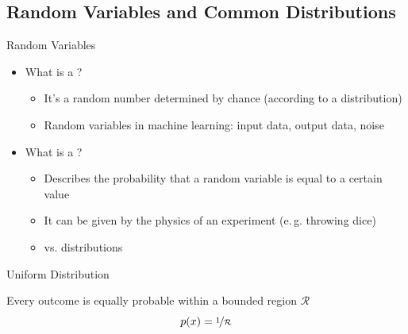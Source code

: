 \subsection{Random Variables and Common Distributions}

\begin{frame}{Random Variables}{}
	\begin{itemize}
		\item What is a ? \pause
		\begin{itemize}
			\item It's a random number determined by chance (according to a distribution)
			\item Random variables in machine learning: input data, output data, noise
		\end{itemize}
		\item What is a ? \pause
		\begin{itemize}
			\item Describes the probability that a random variable is equal to a certain value
			\item It can be given by the physics of an experiment (e.\,g. throwing dice)
			\item {} vs.  distributions
		\end{itemize}
	\end{itemize}
\end{frame}


\begin{frame}{Uniform Distribution}{}
	
	
	\begin{center}
		Every outcome is equally probable within a bounded region $\mathcal{R}$
		\begin{equation}
			p(x) = \nicefrac{1}{\mathcal{R}}
		\end{equation}
	\end{center}
\end{frame}


